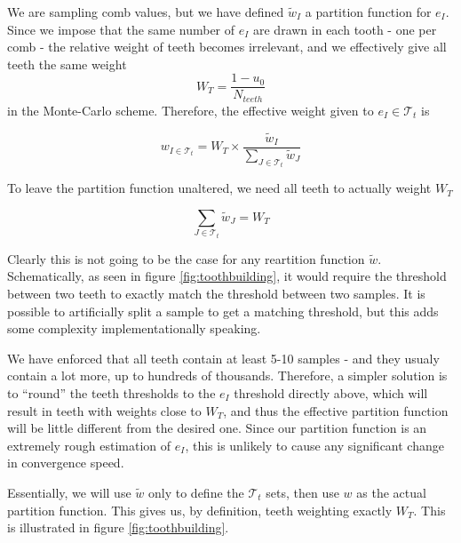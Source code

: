 \documentclass[./thesis.tex]{subfiles}
\begin{document}
We are sampling comb values, but we have defined $\tilde w_I$ a partition function for $e_I$. Since we impose that the same number of $e_I$ are drawn in each tooth - one per comb - the relative weight of teeth becomes irrelevant, and we effectively give all teeth the same weight 
\begin{equation}
W_T=\frac{1-u_0}{N_{teeth}}
\end{equation}
in the Monte-Carlo scheme. Therefore, the effective weight given to $e_I \in \mathcal{T}_t$ is

\begin{equation}
w_{I \in \mathcal{T}_t} = W_T \times \frac{\tilde w_I}{\sum_{J \in \mathcal{T}_t} \tilde w_J}
\end{equation}

To leave the partition function unaltered, we need all teeth to actually weight $W_T$

\begin{equation}
\sum_{J \in \mathcal{T}_t} \tilde w_J = W_T
\end{equation}

Clearly this is not going to be the case for any reartition function $\tilde w$. Schematically, as seen in figure \ref{fig:toothbuilding}, it would require the threshold between two teeth to exactly match the threshold between two samples. It is possible to artificially split a sample to get a matching threshold, but this adds some complexity implementationally speaking.

We have enforced that all teeth contain at least 5-10 samples - and they usualy contain a lot more, up to hundreds of thousands. Therefore, a simpler solution is to ``round'' the teeth thresholds to the $e_I$ threshold directly above, which will result in teeth with weights close to $W_T$, and thus the effective partition function will be little different from the desired one. Since our partition function is an extremely rough estimation of $e_I$, this is unlikely to cause any significant change in convergence speed.

Essentially, we will use $\tilde w$ only to define the $\mathcal{T}_t$ sets, then use $w$ as the actual partition function. This gives us, by definition, teeth weighting exactly $W_T$.
This is illustrated in figure \ref{fig:toothbuilding}.
 
\end{document}
